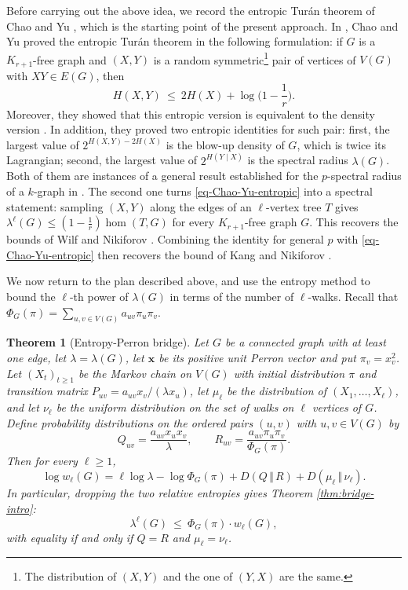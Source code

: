 \documentclass[11pt, a4paper]{article}
\newtheorem{theorem}{Theorem}[section]
\theoremstyle{definition}
\theoremstyle{plain}
\renewcommand{\le}{\leqslant}
\renewcommand{\ge}{\geqslant}
\newcommand{\PhiG}{\Phi_G}
\begin{document}
\smallskip 
Before carrying out the above idea, we record the entropic Tur\'{a}n theorem of Chao and Yu \cite{CY2026}, which is the starting point of the present approach. 
In \cite[Theorem 1.2]{CY2026},  
Chao and Yu  proved the entropic Tur\'an theorem in the following formulation: if $G$ is a $K_{r+1}$-free graph and $(X,Y)$ is a random 
symmetric\footnote{The distribution of $(X,Y)$ and the one of $(Y,X)$ are the same.} pair of vertices of $V(G)$ with $XY\in E(G)$, 
then 
\begin{equation}
\label{eq-Chao-Yu-entropic}
  H(X,Y) \ \le \  2H(X)+\log \Big(1-\frac1r \Big).
  \end{equation}
 Moreover, they showed that this entropic version is equivalent to the density version \cite[Corollary 5.7]{CY2026}. 
In addition, they proved two entropic identities for such pair: first,  the largest value of $2^{H(X,Y)-2H(X)}$ is the blow-up density of $G$,
which is twice its Lagrangian; second, the largest value of $2^{H(Y\mid X)}$ is the spectral radius
$\lambda (G)$. 
Both of them are instances of a general result established for the $p$-spectral radius of a
$k$-graph in \cite[Proposition 5.4]{CY2026}. 
The second one turns \eqref{eq-Chao-Yu-entropic} into a
spectral statement: sampling $(X,Y)$ along the edges
of an $\ell$-vertex tree $T$ gives
$\lambda^{\ell}(G)\le (1-\frac1r)\hom (T,G)$ for every
$K_{r+1}$-free graph $G$. This recovers the bounds of
Wilf \cite{Wilf1986} and Nikiforov
\cite{Nik2002, Nik2006}. Combining the identity
for general $p$ with \eqref{eq-Chao-Yu-entropic} then 
 recovers the bound of Kang and Nikiforov
\cite{KN2014}.

\smallskip  
We now return to the plan described above, and use the entropy method to bound the $\ell$-th power of $\lambda (G)$ in terms of the number of $\ell$-walks. 
Recall that $\PhiG(\pi) = \sum_{u,v\in V(G)} a_{uv}\pi_u \pi_v$. 


\begin{theorem}[Entropy-Perron bridge]
\label{thm:entropy-bridge}
Let $G$ be a connected graph with at least one
edge, let $\lambda =\lambda (G)$, let $\bm{x}$ be
its positive unit Perron vector and put
$\pi_v=x_v^2$. Let $(X_t)_{t\ge 1}$ be the Markov
chain on $V(G)$ with initial distribution $\pi$ and
transition matrix $P_{uv}=a_{uv}x_v/(\lambda x_u)$,
let $\mu_\ell$ be the distribution of
$(X_1, \ldots ,X_\ell )$, and let $\nu_\ell$ be the
uniform distribution on the set of walks on $\ell$
vertices of $G$. Define probability distributions on
the ordered pairs $(u,v)$ with $u,v\in V(G)$ by
\[ Q_{uv}=\frac{a_{uv}x_ux_v}{\lambda},
  \qquad
  R_{uv}=\frac{a_{uv}\pi_u\pi_v}{\Phi_G(\pi )}.
\]
Then for every $\ell \ge 1$, 
\begin{equation}\label{eq:bridge-exact}
  \log w_\ell (G)=\ell \log \lambda -\log \Phi_G (\pi )
  +D(Q\, \Vert \, R)+D(\mu_\ell \, \Vert \, \nu_\ell ).
\end{equation}
In particular, dropping the two relative entropies gives Theorem
\ref{thm:bridge-intro}:
$$\lambda^\ell (G) \ \le \  
\Phi_G(\pi )\cdot w_\ell (G), $$
with equality if and only if $Q=R$ and $\mu_\ell =\nu_\ell$. 
\end{theorem}
\end{document}
